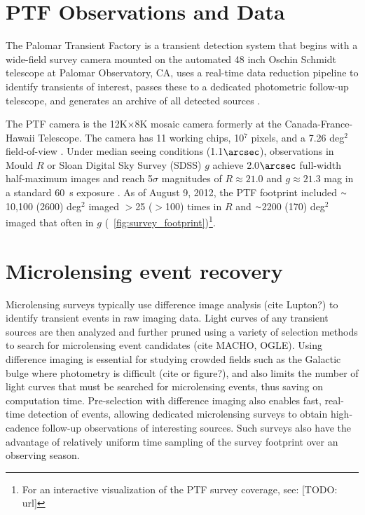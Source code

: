 \documentclass[12pt,preprint]{aastex}
\newcommand{\apwsim}{\raisebox{0.2ex}{\scriptsize$\sim$\normalsize}}
\begin{document}
\section{PTF Observations and Data}
The Palomar Transient Factory is a transient detection system that begins with a wide-field survey camera mounted on the automated 48 inch Oschin Schmidt telescope at Palomar Observatory, CA, uses a real-time data reduction pipeline to identify transients of interest, passes these to a dedicated photometric follow-up telescope, and generates an archive of all detected sources \citep{nick2009,rau2009}.

The PTF camera is the 12K$\times$8K mosaic camera formerly at the Canada-France-Hawaii Telescope. The camera has 11 working chips, 10$^7$ pixels, and a 7.26 deg$^2$ field-of-view \citep{rahmer2008}. Under median seeing conditions (1.1$\arcsec$), observations in Mould $R$ or Sloan Digital Sky Survey (SDSS) $g$ achieve 2.0$\arcsec$ full-width half-maximum images and reach 5$\sigma$ magnitudes of $R \approx 21.0$ and $g \approx 21.3$ mag in a standard 60~s exposure \citep{nick2010}. As of August 9, 2012, the PTF footprint included $\apwsim$10,100 (2600) deg$^2$ imaged $>$25 ($>$100) times in $R$ and $\apwsim$2200 (170) deg$^2$ imaged that often in $g$ (\figurename~\ref{fig:survey_footprint})\footnote{For an interactive visualization of the PTF survey coverage, see: [TODO: url]}.

\section{Microlensing event recovery} \label{sec:event_recovery}
Microlensing surveys typically use difference image analysis (cite Lupton?) to identify transient events in raw imaging data. Light curves of any transient sources are then analyzed and further pruned using a variety of selection methods to search for microlensing event candidates (cite MACHO, OGLE). Using difference imaging is essential for studying crowded fields such as the Galactic bulge where photometry is difficult (cite or figure?), and also limits the number of light curves that must be searched for microlensing events, thus saving on computation time. Pre-selection with difference imaging also enables fast, real-time detection of events, allowing dedicated microlensing surveys to obtain high-cadence follow-up observations of interesting sources. Such surveys also have the advantage of relatively uniform time sampling of the survey footprint over an observing season.
\end{document}
